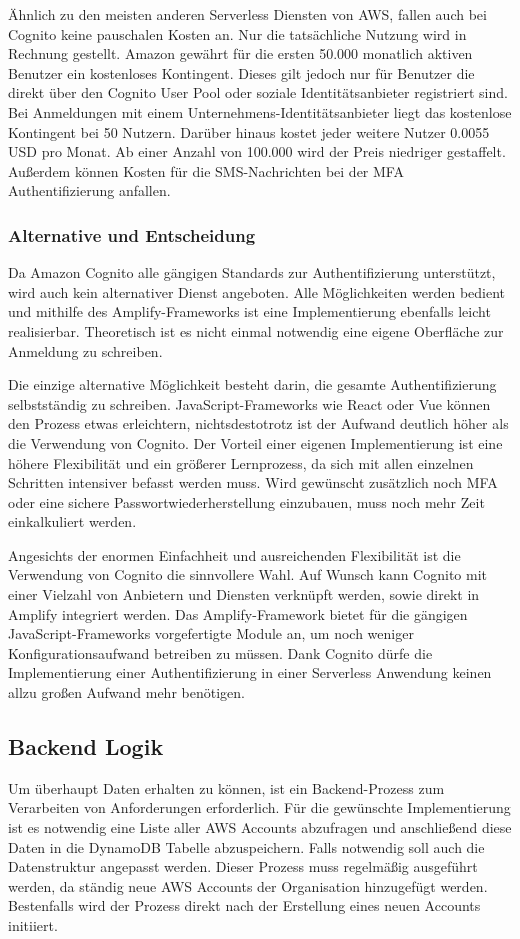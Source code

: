 {Ähnlich zu den meisten anderen Serverless Diensten von AWS, fallen auch bei Cognito keine pauschalen Kosten an.
Nur die tatsächliche Nutzung wird in Rechnung gestellt.
Amazon gewährt für die ersten 50.000 monatlich aktiven Benutzer ein kostenloses Kontingent.
Dieses gilt jedoch nur für Benutzer die direkt über den Cognito User Pool oder soziale Identitätsanbieter registriert sind.
Bei Anmeldungen mit einem Unternehmens-Identitätsanbieter liegt das kostenlose Kontingent bei 50 Nutzern.
Darüber hinaus kostet jeder weitere Nutzer 0.0055 USD pro Monat.
Ab einer Anzahl von 100.000 wird der Preis niedriger gestaffelt.
Außerdem können Kosten für die SMS-Nachrichten bei der MFA Authentifizierung anfallen.  \cite[]{CognitoPreise}


\subsubsection{Alternative und Entscheidung}
\label{CognitoEntscheidung}
Da Amazon Cognito alle gängigen Standards zur Authentifizierung unterstützt, wird auch kein alternativer Dienst angeboten.
Alle Möglichkeiten werden bedient und mithilfe des Amplify-Frameworks ist eine Implementierung ebenfalls leicht realisierbar.
Theoretisch ist es nicht einmal notwendig eine eigene Oberfläche zur Anmeldung zu schreiben.

Die einzige alternative Möglichkeit besteht darin, die gesamte Authentifizierung selbstständig zu schreiben.
JavaScript-Frameworks wie React oder Vue können den Prozess etwas erleichtern, nichtsdestotrotz ist der Aufwand deutlich höher als die Verwendung von Cognito.
Der Vorteil einer eigenen Implementierung ist eine höhere Flexibilität und ein größerer Lernprozess, da sich mit allen einzelnen Schritten intensiver befasst werden muss.
Wird gewünscht zusätzlich noch MFA oder eine sichere Passwortwiederherstellung einzubauen, muss noch mehr Zeit einkalkuliert werden.

Angesichts der enormen Einfachheit und ausreichenden Flexibilität ist die Verwendung von Cognito die sinnvollere Wahl.
Auf Wunsch kann Cognito mit einer Vielzahl von Anbietern und Diensten verknüpft werden, sowie direkt in Amplify integriert werden.
Das Amplify-Framework bietet für die gängigen JavaScript-Frameworks vorgefertigte Module an, um noch weniger Konfigurationsaufwand betreiben zu müssen.
Dank Cognito dürfe die Implementierung einer Authentifizierung in einer Serverless Anwendung keinen allzu großen Aufwand mehr benötigen.


\subsection{Backend Logik}
Um überhaupt Daten erhalten zu können, ist ein Backend-Prozess zum Verarbeiten von Anforderungen erforderlich.
Für die gewünschte Implementierung ist es notwendig eine Liste aller AWS Accounts abzufragen und anschließend diese Daten in die DynamoDB Tabelle abzuspeichern.
Falls notwendig soll auch die Datenstruktur angepasst werden.
Dieser Prozess muss regelmäßig ausgeführt werden, da ständig neue AWS Accounts der Organisation hinzugefügt werden.
Bestenfalls wird der Prozess direkt nach der Erstellung eines neuen Accounts initiiert.

}
